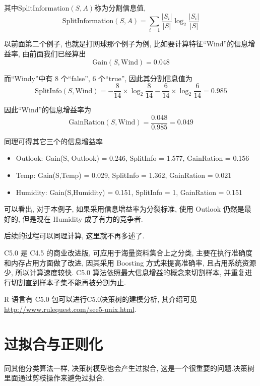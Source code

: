 \documentclass[a4paper,UTF8]{ctexart}
\theoremstyle{plain} \newtheorem{theorem}{定理}[section]
\theoremstyle{plain} \newtheorem{definition}{定义}[section]
\theoremstyle{plain} \newtheorem{lemma}{引理}[section]
\theoremstyle{plain} \newtheorem{proposition}{命题}[section]
\theoremstyle{plain} \newtheorem{example}{例}
\theoremstyle{plain} \newtheorem{remark}{注}
\theoremstyle{plain} \newtheorem{corollary}{推论}[section]
\begin{document}
其中$\mathrm{SplitInformation}(S, A)$称为分割信息值,
\begin{equation*}
\mathrm{SplitInformation}(S, A) = \sum_{i=1} \frac{|S_i|}{|S|} \log_{2} \frac{|S_i|}{|S|}
\end{equation*}

以前面第二个例子, 也就是打网球那个例子为例, 比如要计算特征“Wind”的信息增益率, 由前面我们已经算出
\begin{equation*}
\mathrm{Gain}(S, \mathrm{Wind}) = 0.048
\end{equation*}

而“Windy”中有 8 个“false”, 6 个“true”, 因此其分割信息值为
\begin{equation*}
\mathrm{SplitInfo}(S, \mathrm{Wind}) = -\frac{8}{14} \times \log_{2} \frac{8}{14} - \frac{6}{14} \times \log_{2} \frac{6}{14} = 0.985
\end{equation*}

因此“Wind”的信息增益率为
\begin{equation*}
\mathrm{GainRation}(S, \mathrm{Wind}) = \frac{0.048}{0.985} = 0.049
\end{equation*}

同理可得其它三个的信息增益率
\begin{itemize}
\item Outlook: Gain(S, Outlook) = 0.246, SplitInfo = 1.577, GainRation = 0.156

\item Temp: Gain(S,Temp) = 0.029,  SplitInfo = 1.362, GainRation = 0.021

\item Humidity: Gain(S,Humidity) = 0.151,  SplitInfo = 1, GainRation = 0.151
\end{itemize}

可以看出, 对于本例子, 如果采用信息增益率为分裂标准, 使用 Outlook 仍然是最好的, 但是现在 Humidity 成了有力的竞争者.

后续的过程可以同理计算, 这里就不再多述了.


C5.0 是 C4.5 的商业改进版, 可应用于海量资料集合上之分类, 主要在执行准确度和内存占用方面做了改进, 因其采用 Boosting 方式来提高准确率, 且占用系统资源少, 所以计算速度较快. C5.0 算法依照最大信息增益的概念来切割样本, 并重复进行切割直到样本子集不能再被分割为止.

R 语言有 C5.0 包可以进行C5.0决策树的建模分析, 其介绍可见\url{http://www.rulequest.com/see5-unix.html}.




\section{过拟合与正则化}
同其他分类算法一样, 决策树模型也会产生过拟合, 这是一个很重要的问题.决策树里面通过剪枝操作来避免过拟合.
\end{document}
